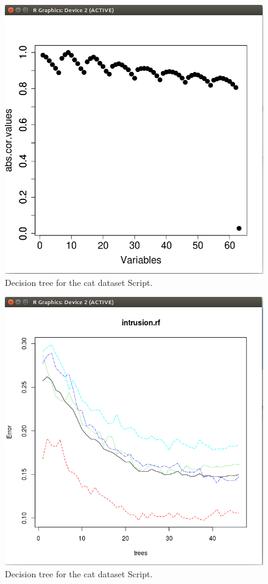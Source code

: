 \documentclass[12pt, letterpaper]{article}
\begin{document}
\begin{figure}[H]
\centering
\includegraphics[width=5.0in]{catplot3}
\caption{Decision tree for the cat dataset Script.}
\label{fig:dtcd}
\end{figure}

\begin{figure}[H]
\centering
\includegraphics[width=5.0in]{catplot5}
\caption{Decision tree for the cat dataset Script.}
\label{fig:dtcd}
\end{figure}
\end{document}
